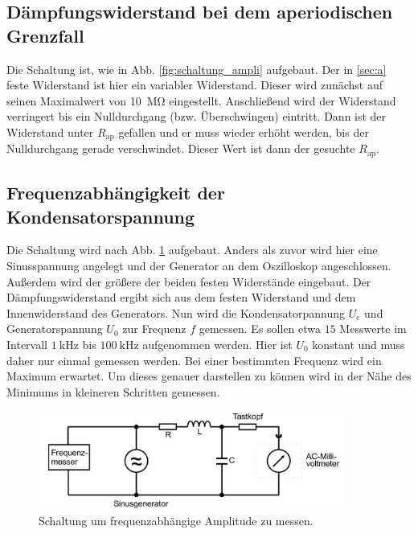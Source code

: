 \subsection{Dämpfungswiderstand bei dem aperiodischen Grenzfall}
Die Schaltung ist, wie in Abb. \ref{fig:schaltung_ampli} aufgebaut. Der in \autoref{sec:a} feste Widerstand
ist hier ein variabler Widerstand. Dieser wird zunächst auf seinen Maximalwert von \SI{10}{\mega\ohm} eingestellt.
Anschließend wird der Widerstand verringert bis ein Nulldurchgang (bzw. Überschwingen) eintritt.
Dann ist der Widerstand unter $R_\text{ap}$ gefallen und er muss wieder erhöht werden, bis der Nulldurchgang gerade verschwindet.
Dieser Wert ist dann der gesuchte $R_\text{ap}$.

\subsection{Frequenzabhängigkeit der Kondensatorspannung}
Die Schaltung wird nach Abb. \ref{fig:spannungc} aufgebaut.
Anders als zuvor wird hier eine Sinusspannung angelegt und der Generator an dem Oszilloskop angeschlossen.
Außerdem wird der größere der beiden festen Widerstände eingebaut.
Der Dämpfungswiderstand ergibt sich aus dem festen Widerstand und dem Innenwiderstand des Generators.
Nun wird die Kondensatorpannung $U_\text{c}$ und Generatorspannung $U_0$ zur Frequenz $f$ gemessen.
Es sollen etwa $15$ Messwerte im Intervall $\SI{1}{\kilo\hertz}$ bis $\SI{100}{\kilo\hertz}$ aufgenommen werden.
Hier ist $U_0$ konstant und muss daher nur einmal gemessen werden.
Bei einer bestimmten Frequenz wird ein Maximum erwartet.
Um dieses genauer darstellen zu können wird in der Nähe des Minimums in kleineren Schritten gemessen.
\begin{figure}
    \centering
    \includegraphics[width=10cm]{content/data/frequenz.jpg}
    \caption{Schaltung um frequenzabhängige Amplitude zu messen. \cite[S.295]{anleitung}}
    \label{fig:spannungc}
\end{figure}

